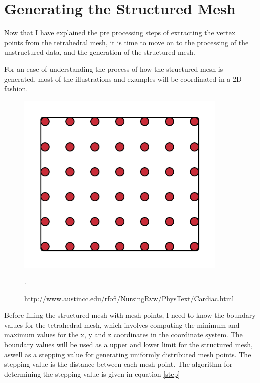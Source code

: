 \section{Generating the Structured Mesh}
\label{generating_the structured_mesh}
Now that I have explained the pre processing steps of extracting the vertex points from the tetrahedral mesh, it is time to move on to the processing of the unstructured data, and the generation of the structured mesh.

For an ease of understanding the process of how the structured mesh is generated, most of the illustrations and examples will be coordinated in a 2D fashion.

\begin{figure}[h]
 \centering 
     \includegraphics[width=0.9\textwidth]{bilder/m_grid_points}
     \caption{http://www.austincc.edu/rfofi/NursingRvw/PhysText/Cardiac.html}.
     \label{m_grid_points.png}
\end{figure}

Before filling the structured mesh with mesh points, I need to know the boundary values for the tetrahedral mesh, which involves computing the minimum and maximum values for the x, y and z coordinates in the coordinate system. The boundary values will be used as a upper and lower limit for the structured mesh, aswell as a stepping value for generating uniformly distributed mesh points. The stepping value is the distance between each mesh point. The algorithm for determining the stepping value is given in equation \ref{step}

